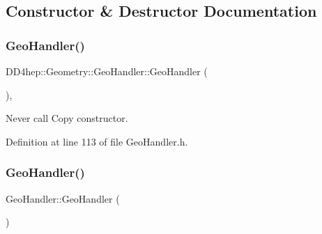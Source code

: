 \subsection{Constructor \& Destructor Documentation}
\hypertarget{class_d_d4hep_1_1_geometry_1_1_geo_handler_acade5475bb3291d079f7eda3daded0e7}{}\label{class_d_d4hep_1_1_geometry_1_1_geo_handler_acade5475bb3291d079f7eda3daded0e7} 
\subsubsection{\texorpdfstring{Geo\+Handler()}{GeoHandler()}\hspace{0.1cm}{\footnotesize\ttfamily [1/3]}}
{\footnotesize\ttfamily D\+D4hep\+::\+Geometry\+::\+Geo\+Handler\+::\+Geo\+Handler (\begin{DoxyParamCaption}\item[{const \hyperlink{class_d_d4hep_1_1_geometry_1_1_geo_handler}{Geo\+Handler} \&}]{ }\end{DoxyParamCaption})\hspace{0.3cm}{\ttfamily [inline]}, {\ttfamily [private]}}



Never call Copy constructor. 



Definition at line 113 of file Geo\+Handler.\+h.

\hypertarget{class_d_d4hep_1_1_geometry_1_1_geo_handler_abbce30079f47cd87244d2d5ac2e301e4}{}\label{class_d_d4hep_1_1_geometry_1_1_geo_handler_abbce30079f47cd87244d2d5ac2e301e4} 
\subsubsection{\texorpdfstring{Geo\+Handler()}{GeoHandler()}\hspace{0.1cm}{\footnotesize\ttfamily [2/3]}}
{\footnotesize\ttfamily Geo\+Handler\+::\+Geo\+Handler (\begin{DoxyParamCaption}{ }\end{DoxyParamCaption})}



